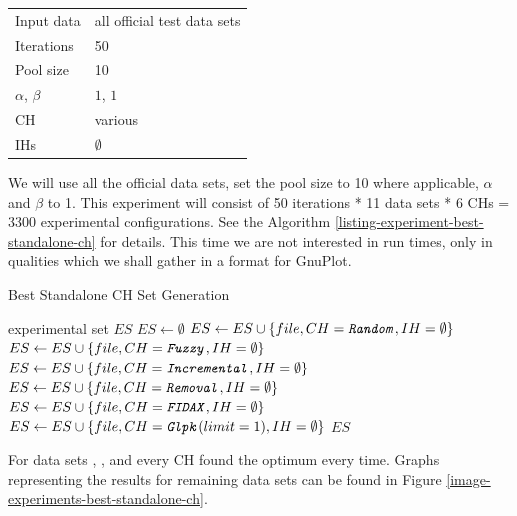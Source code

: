 \begin{center}
\bigskip
\begin{tabular}{| l | l |}
  \hline
  \hline
  Input data        & all official test data sets \\
  Iterations        & 50 \\
  Pool size         & 10 \\
  $\alpha$, $\beta$ & $1$, $1$ \\
  CH                & various \\
  IHs               & $\emptyset$ \\
  \hline
\end{tabular}
\bigskip
\end{center}

We will use all the official data sets, set the pool size to 10 where applicable, $\alpha$ and $\beta$ to 1. This experiment will consist of 50 iterations * 11 data sets * 6 CHs = 3300 experimental configurations. See the Algorithm \ref{listing-experiment-best-standalone-ch} for details. This time we are not interested in run times, only in qualities which we shall gather in a format for GnuPlot.\\

\begin{algorithm}
\caption{Best Standalone CH Set Generation}
\label{listing-experiment-best-standalone-ch}
\begin{algorithmic}
\ENSURE experimental set $ES$
\STATE $ES \gets \emptyset$
    	\STATE $ES \gets ES \cup \{file, CH = \texttt{\textit{Random}}, IH = \emptyset\}$
    	\STATE $ES \gets ES \cup \{file, CH = \texttt{\textit{Fuzzy}}, IH = \emptyset\}$
    	\STATE $ES \gets ES \cup \{file, CH = \texttt{\textit{Incremental}}, IH = \emptyset\}$
    	\STATE $ES \gets ES \cup \{file, CH = \texttt{\textit{Removal}}, IH = \emptyset\}$
    	\STATE $ES \gets ES \cup \{file, CH = \texttt{\textit{FIDAX}}, IH = \emptyset\}$
    	\STATE $ES \gets ES \cup \{file, CH = \texttt{\textit{Glpk}}(limit = 1), IH = \emptyset\}$
  \ENDFOR
\ENDFOR
\RETURN $ES$
\end{algorithmic}
\end{algorithm}

For data sets , ,  and  every CH found the optimum every time. Graphs representing the results for remaining data sets can be found in Figure \ref{image-experiments-best-standalone-ch}.

